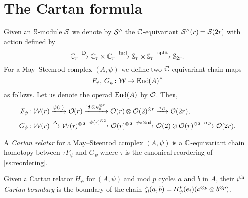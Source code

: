 
\section{The Cartan formula}\label{s:cartan}

Given an $\mathbb{S}$-module $\mathcal{S}$ we denote by $\mathcal{S}^\wedge$ the $\mathbb{C}$-equivariant $\mathcal{S}^\wedge(r) = \mathcal{S}(2r)$ with
action defined by
\begin{equation}\label{eq:cyclic to 2-symetric}
	\mathbb{C}_r \xrightarrow{\mathrm{D}}
	\mathbb{C}_r \times \mathbb{C}_r \xrightarrow{\mathrm{incl}}
	\mathbb{S}_r \times \mathbb{S}_r \xrightarrow{\mathrm{split}}
	\mathbb{S}_{2r}.
\end{equation}
For a May--Steenrod complex $(A,\psi)$ we define two $\mathbb{C}$-equivariant chain maps
\[
F_\psi,\, G_\psi \colon \mathcal{W} \to \mathrm{End}(A)^\wedge
\]
as follows.
Let us denote the operad $\mathrm{End}(A)$ by $\mathcal{O}$.
Then,
\begin{align*}
	F_\psi \colon& \mathcal{W}(r) \xrightarrow{\psi(r)} \mathcal{O}(r) \xrightarrow{\mathsf{id}\, \otimes \psi_0^{\otimes r}}
	\mathcal{O}(r) \otimes \mathcal{O}(2)^{\otimes r} \xrightarrow{\bm{\circ}_{\mathcal{O}}}
	\mathcal{O}(2r), \\
	G_\psi \colon& \mathcal{W}(r) \xrightarrow{\Delta}
	\mathcal{W}(r)^{\otimes 2} \xrightarrow{\psi(r)^{\otimes 2}}
	\mathcal{O}(r)^{\otimes 2} \xrightarrow{\psi_0 \otimes\, \mathsf{id}}
	\mathcal{O}(2) \otimes \mathcal{O}(r)^{\otimes 2} \xrightarrow{\bm{\circ}_{\mathcal{O}}}
	\mathcal{O}(2r).
\end{align*}

\begin{definition*}
	A \textit{Cartan relator} for a May--Steenrod complex $(A, \psi)$ is a $\mathbb{C}$-equivariant chain homotopy between $\tau F_\psi$ and $G_\psi$ where $\tau$ is the canonical reordering of \cref{ss:reordering}.
\end{definition*}

Given a Cartan relator $H_\psi$ for $(A,\psi)$ and mod $p$ cycles $a$ and $b$ in $A$, their \textit{$i^{\mathrm{th}}$ Cartan boundary} is the boundary of the chain $\zeta_i(a,b) = H_\psi^p(e_i)(a^{\otimes p} \otimes b^{\otimes p})$.

